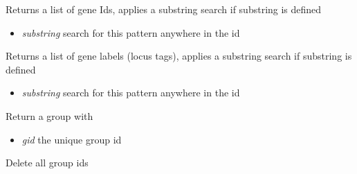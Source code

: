 \documentclass[a4paper,11pt,english]{sphinxmanual}
\begin{document}
\begin{fulllineitems}
\begin{fulllineitems}
\begin{itemize}
\end{itemize}

\end{fulllineitems}


\begin{fulllineitems}
\label{modules_doc:cbmpy.CBModel.Model.getGeneIds}
Returns a list of gene Ids, applies a substring search if substring is defined
\begin{itemize}
\item {} 
\emph{substring} search for this pattern anywhere in the id

\end{itemize}

\end{fulllineitems}


\begin{fulllineitems}
\label{modules_doc:cbmpy.CBModel.Model.getGeneLabels}
Returns a list of gene labels (locus tags), applies a substring search if substring is defined
\begin{itemize}
\item {} 
\emph{substring} search for this pattern anywhere in the id

\end{itemize}

\end{fulllineitems}


\begin{fulllineitems}
\label{modules_doc:cbmpy.CBModel.Model.getGroup}
Return a group with
\begin{itemize}
\item {} 
\emph{gid} the unique group id

\end{itemize}

\end{fulllineitems}


\begin{fulllineitems}
\label{modules_doc:cbmpy.CBModel.Model.getGroupIds}
Delete all group ids


\end{fulllineitems}
\end{fulllineitems}
\end{document}
